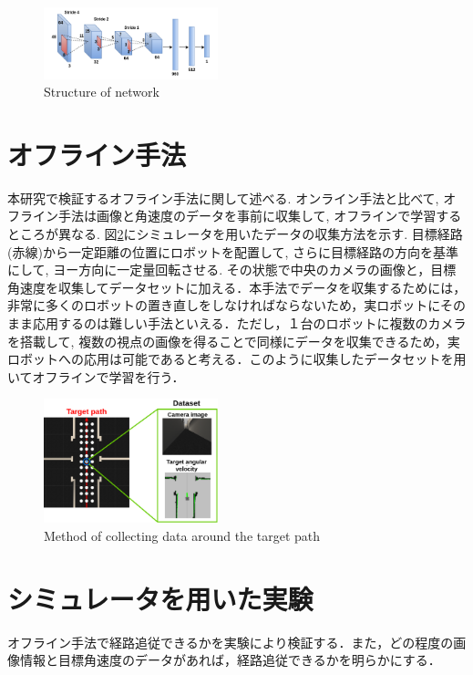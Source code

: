 \documentclass{ujarticle}
\begin{document}
\begin{figure}[h]
	\centering
	\includegraphics[width=0.45\textwidth]{img/cnn.png}
	\caption{Structure of network}
	\label{Fig:cnn}
\end{figure}

\newpage
\section{オフライン手法}%
本研究で検証するオフライン手法に関して述べる. オンライン手法と比べて, オフライン手法は画像と角速度のデータを事前に収集して, オフラインで学習するところが異なる. 図\ref{Fig:collect}にシミュレータを用いたデータの収集方法を示す. 目標経路(赤線)から一定距離の位置にロボットを配置して, さらに目標経路の方向を基準にして, ヨー方向に一定量回転させる. その状態で中央のカメラの画像と，目標角速度を収集してデータセットに加える．本手法でデータを収集するためには，非常に多くのロボットの置き直しをしなければならないため，実ロボットにそのまま応用するのは難しい手法といえる．ただし，１台のロボットに複数のカメラを搭載して, 複数の視点の画像を得ることで同様にデータを収集できるため，実ロボットへの応用は可能であると考える．このように収集したデータセットを用いてオフラインで学習を行う．

\begin{figure}[h]
		\centering
		\includegraphics[width=0.45\textwidth]{img/proposed.png}
		\caption{Method of collecting data around the target path}
		\label{Fig:collect}
\end{figure}

\newpage
\section{シミュレータを用いた実験}%
オフライン手法で経路追従できるかを実験により検証する．また，どの程度の画像情報と目標角速度のデータがあれば，経路追従できるかを明らかにする．
\end{document}
